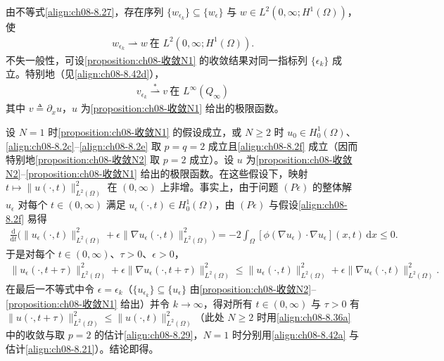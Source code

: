 \documentclass[../../main.tex]{subfiles}%
\begin{document}
\begin{remark}\label{remark:ch08-w收敛}
由不等式\eqref{align:ch08-8.27}，存在序列 $\{w_{\epsilon_k}\}\subseteq\{w_\epsilon\}$ 与 $w\in L^2(0,\infty;H^1(\Omega))$，使
\begin{align}
w_{\epsilon_k}\rightharpoonup w\ \text{在 }L^2(0,\infty;H^1(\Omega)). \label{align:ch08-8.45}
\end{align}
不失一般性，可设\cref{proposition:ch08-收敛N1} 的收敛结果对同一指标列 $\{\epsilon_k\}$ 成立。特别地（见\eqref{align:ch08-8.42d}），
\begin{align}
v_{\epsilon_k}\stackrel{*}{\rightharpoonup}v\ \text{在 }L^\infty(Q_\infty) \label{align:ch08-8.46}
\end{align}
其中 $v\triangleq \partial_x u$，$u$ 为\cref{proposition:ch08-收敛N1} 给出的极限函数。
\end{remark}

\begin{remark}\label{remark:ch08-能量衰减}
设 $N=1$ 时\cref{proposition:ch08-收敛N1} 的假设成立，或 $N\geqslant2$ 时 $u_0\in H^1_0(\Omega)$、\eqref{align:ch08-8.2c}--\eqref{align:ch08-8.2e} 取 $p=q=2$ 成立且\eqref{align:ch08-8.2f} 成立（因而特别地\cref{proposition:ch08-收敛N2} 取 $p=2$ 成立）。设 $u$ 为\cref{proposition:ch08-收敛N2}--\cref{proposition:ch08-收敛N1} 给出的极限函数。在这些假设下，映射 $t\mapsto\|u(\cdot,t)\|^2_{L^2(\Omega)}$ 在 $(0,\infty)$ 上非增。事实上，由于问题 $(P\epsilon)$ 的整体解 $u_\epsilon$ 对每个 $t\in(0,\infty)$ 满足 $u_\epsilon(\cdot,t)\in H^1_0(\Omega)$，由 $(P\epsilon)$ 与假设\eqref{align:ch08-8.2f} 易得
\begin{align*}
\frac{\mathrm{d}}{\mathrm{d}t}\Big(\|u_\epsilon(\cdot,t)\|^2_{L^2(\Omega)}+\epsilon\|\nabla u_\epsilon(\cdot,t)\|^2_{L^2(\Omega)}\Big)
=-2\int_\Omega[\phi(\nabla u_\epsilon)\cdot\nabla u_\epsilon](x,t)\,\mathrm{d}x\leqslant0.
\end{align*}
于是对每个 $t\in(0,\infty)$、$\tau>0$、$\epsilon>0$，
\begin{align}
\|u_\epsilon(\cdot,t+\tau)\|^2_{L^2(\Omega)}+\epsilon\|\nabla u_\epsilon(\cdot,t+\tau)\|^2_{L^2(\Omega)}
\leqslant\|u_\epsilon(\cdot,t)\|^2_{L^2(\Omega)}+\epsilon\|\nabla u_\epsilon(\cdot,t)\|^2_{L^2(\Omega)}. \label{align:ch08-8.47}
\end{align}
在最后一不等式中令 $\epsilon=\epsilon_k$（$\{u_{\epsilon_k}\}\subseteq\{u_\epsilon\}$ 由\cref{proposition:ch08-收敛N2}--\cref{proposition:ch08-收敛N1} 给出）并令 $k\to\infty$，得对所有 $t\in(0,\infty)$ 与 $\tau>0$ 有 $\|u(\cdot,t+\tau)\|^2_{L^2(\Omega)}\leqslant\|u(\cdot,t)\|^2_{L^2(\Omega)}$（此处 $N\geqslant2$ 时用\eqref{align:ch08-8.36a} 中的收敛与取 $p=2$ 的估计\eqref{align:ch08-8.29}，$N=1$ 时分别用\eqref{align:ch08-8.42a} 与估计\eqref{align:ch08-8.21}）。结论即得。
\end{remark}
\end{document}
